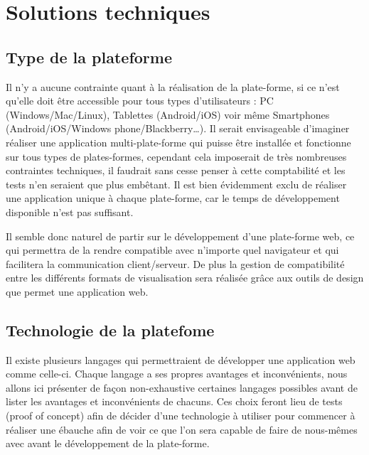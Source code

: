 \section{Solutions techniques}
\label{sec:technique}

    \subsection{Type de la plateforme}
    \label{subsec:plateforme}
    Il n’y a aucune contrainte quant à la réalisation de la plate-forme, si ce n’est qu’elle doit être
    accessible pour tous types d’utilisateurs : PC (Windows/Mac/Linux), Tablettes (Android/iOS) voir
    même Smartphones (Android/iOS/Windows phone/Blackberry…). Il serait envisageable d’imaginer réaliser
    une application multi-plate-forme qui puisse être installée et fonctionne sur tous types de plates-formes,
    cependant cela imposerait de très nombreuses contraintes techniques, il faudrait sans cesse penser
    à cette comptabilité et les tests n’en seraient que plus embêtant. Il est bien évidemment exclu de réaliser
    une application unique à chaque plate-forme, car le temps de développement disponible n’est pas suffisant.

    Il semble donc naturel de partir sur le développement d’une plate-forme web, ce qui permettra de la rendre
    compatible avec n’importe quel navigateur et qui facilitera la communication client/serveur. De plus la gestion
    de compatibilité entre les différents formats de visualisation sera réalisée grâce aux outils de design
    que permet une application web.

    \subsection{Technologie de la platefome}
    \label{subsec:technologie}
    Il existe plusieurs langages qui permettraient de développer une application web comme celle-ci.
    Chaque langage a ses propres avantages et inconvénients, nous allons ici présenter de façon non-exhaustive
    certaines langages possibles avant de lister les avantages et inconvénients de chacuns. Ces choix feront
    lieu de tests (proof of concept) afin de décider d’une technologie à utiliser pour commencer à réaliser
    une ébauche afin de voir ce que l’on sera capable de faire de nous-mêmes avec avant le développement de la plate-forme.


